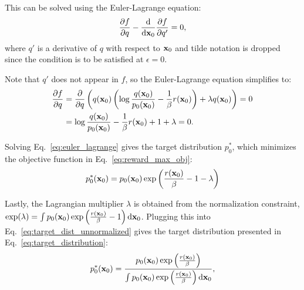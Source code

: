 This can be solved using the Euler-Lagrange equation:
\begin{align}
    \nonumber
    \frac{\partial f}{\partial q}-\frac{\mathrm{d}}{\mathrm{d} \mathbf{x}_0} \frac{\partial f}{\partial q'}=0,
\end{align}
where $q'$ is a derivative of $q$ with respect to $\mathbf{x}_0$ and tilde notation is dropped since the condition is to be satisfied at $\epsilon=0$.

Note that $q'$ does not appear in $f$, so the Euler-Lagrange equation simplifies to:
\begin{align}
    \nonumber 
    \frac{\partial f}{\partial q}&=\frac{\partial}{\partial q}\left( q(\mathbf{x}_0) \left( \log \frac{q(\mathbf{x}_0)}{p_0 (\mathbf{x}_0)}-\frac{1}{\beta} r(\mathbf{x}_0) \right) +\lambda q(\mathbf{x}_0) \right)=0\\
    \label{eq:euler_lagrange}
    &=\log \frac{q(\mathbf{x}_0)}{p_0 (\mathbf{x}_0)}-\frac{1}{\beta} r(\mathbf{x}_0)+1+\lambda=0.
\end{align}

Solving Eq.~\ref{eq:euler_lagrange} gives the target distribution $p_0^{*}$, which minimizes the objective function in Eq.~\ref{eq:reward_max_obj}:
\begin{align}
    \label{eq:target_dist_unnormalized}
    p^{*}_0(\mathbf{x}_0)=p_0 (\mathbf{x}_0) \exp  \left(\frac{r(\mathbf{x}_0)}{\beta}-1-\lambda \right)
\end{align}

Lastly, the Lagrangian multiplier $\lambda$ is obtained from the normalization constraint, $\exp (\lambda)=\int p_0 (\mathbf{x}_0) \exp \left(\frac{r(\mathbf{x}_0)}{\beta}-1\right) \mathrm{d} \mathbf{x}_0$. Plugging this into Eq.~\ref{eq:target_dist_unnormalized} gives the target distribution presented in Eq.~\ref{eq:target_distribution}:
\begin{align}
    \label{eq:appendix_target_distribution}
    p^{*}_0(\mathbf{x}_0) = \frac{p_0(\mathbf{x}_0) \exp \left( \frac{r(\mathbf{x}_0)}{\beta} \right)}{\int p_0 (\mathbf{x}_0) \exp \left( \frac{r(\mathbf{x}_0)}{\beta} \right) \mathrm{d} \mathbf{x}_0 },
\end{align}

